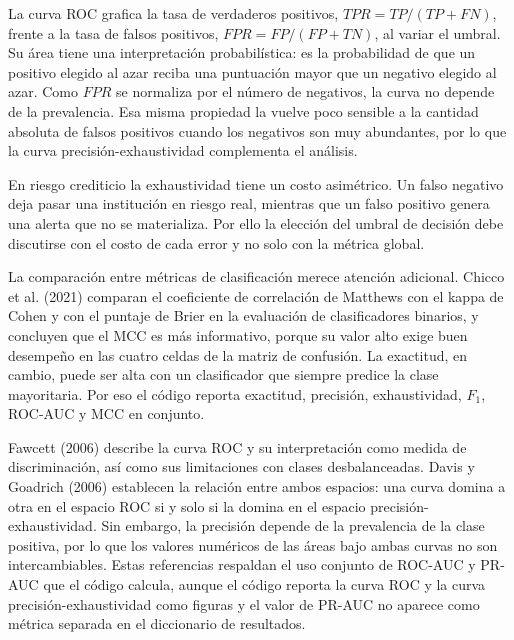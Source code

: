 La curva ROC grafica la tasa de verdaderos positivos, $TPR=TP/(TP+FN)$, frente a la tasa de falsos positivos, $FPR=FP/(FP+TN)$, al variar el umbral. Su área tiene una interpretación probabilística: es la probabilidad de que un positivo elegido al azar reciba una puntuación mayor que un negativo elegido al azar. Como $FPR$ se normaliza por el número de negativos, la curva no depende de la prevalencia. Esa misma propiedad la vuelve poco sensible a la cantidad absoluta de falsos positivos cuando los negativos son muy abundantes, por lo que la curva precisión-exhaustividad complementa el análisis.

En riesgo crediticio la exhaustividad tiene un costo asimétrico. Un falso negativo deja pasar una institución en riesgo real, mientras que un falso positivo genera una alerta que no se materializa. Por ello la elección del umbral de decisión debe discutirse con el costo de cada error y no solo con la métrica global.

La comparación entre métricas de clasificación merece atención adicional. Chicco et al. (2021) comparan el coeficiente de correlación de Matthews con el kappa de Cohen y con el puntaje de Brier en la evaluación de clasificadores binarios, y concluyen que el MCC es más informativo, porque su valor alto exige buen desempeño en las cuatro celdas de la matriz de confusión. La exactitud, en cambio, puede ser alta con un clasificador que siempre predice la clase mayoritaria. Por eso el código reporta exactitud, precisión, exhaustividad, $F_1$, ROC-AUC y MCC en conjunto.

Fawcett (2006) describe la curva ROC y su interpretación como medida de discriminación, así como sus limitaciones con clases desbalanceadas. Davis y Goadrich (2006) establecen la relación entre ambos espacios: una curva domina a otra en el espacio ROC si y solo si la domina en el espacio precisión-exhaustividad. Sin embargo, la precisión depende de la prevalencia de la clase positiva, por lo que los valores numéricos de las áreas bajo ambas curvas no son intercambiables. Estas referencias respaldan el uso conjunto de ROC-AUC y PR-AUC que el código calcula, aunque el código reporta la curva ROC y la curva precisión-exhaustividad como figuras y el valor de PR-AUC no aparece como métrica separada en el diccionario de resultados.


